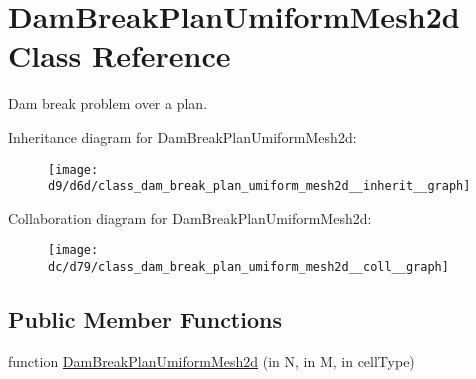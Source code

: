 \hypertarget{class_dam_break_plan_umiform_mesh2d}{}\section{Dam\+Break\+Plan\+Umiform\+Mesh2d Class Reference}
\label{class_dam_break_plan_umiform_mesh2d}


Dam break problem over a plan.  




Inheritance diagram for Dam\+Break\+Plan\+Umiform\+Mesh2d\+:
\nopagebreak
\begin{figure}[H]
\begin{center}
\leavevmode
\texttt{[image: d9/d6d/class\_dam\_break\_plan\_umiform\_mesh2d\_\_inherit\_\_graph]}
\end{center}
\end{figure}


Collaboration diagram for Dam\+Break\+Plan\+Umiform\+Mesh2d\+:
\nopagebreak
\begin{figure}[H]
\begin{center}
\leavevmode
\texttt{[image: dc/d79/class\_dam\_break\_plan\_umiform\_mesh2d\_\_coll\_\_graph]}
\end{center}
\end{figure}
\subsection*{Public Member Functions}
\begin{DoxyCompactItemize}
\item 
function \hyperlink{class_dam_break_plan_umiform_mesh2d_a8c89389e3011a970dfcadb68157a417e}{Dam\+Break\+Plan\+Umiform\+Mesh2d} (in N, in M, in cell\+Type)
\end{DoxyCompactItemize}
